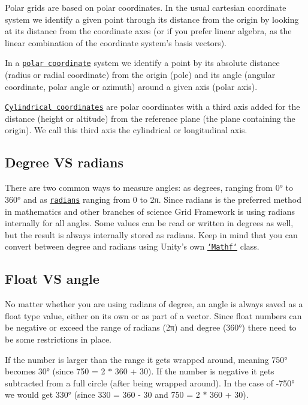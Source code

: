 Polar grids are based on polar coordinates. In the usual cartesian coordinate system we identify a given point through its distance from the origin by looking at its distance from the coordinate axes (or if you prefer linear algebra, as the linear combination of the coordinate system’s basis vectors).

In a \href{http://en.wikipedia.org/wiki/Polar_coordinate_system}{\tt polar coordinate} system we identify a point by its absolute distance (radius or radial coordinate) from the origin (pole) and its angle (angular coordinate, polar angle or azimuth) around a given axis (polar axis).

\href{http://en.wikipedia.org/wiki/Cylindrical_coordinate_system}{\tt Cylindrical coordinates} are polar coordinates with a third axis added for the distance (height or altitude) from the reference plane (the plane containing the origin). We call this third axis the cylindrical or longitudinal axis.

\subsection*{Degree V\+S radians }

There are two common ways to measure angles\+: as degrees, ranging from 0° to 360° and as \href{http://en.wikipedia.org/wiki/Radians}{\tt radians} ranging from 0 to 2π. Since radians is the preferred method in mathematics and other branches of science Grid Framework is using radians internally for all angles. Some values can be read or written in degrees as well, but the result is always internally stored as radians. Keep in mind that you can convert between degree and radians using Unity’s own \href{http://docs.unity3d.com/Documentation/ScriptReference/Mathf.html}{\tt `\+Mathf`} class.

\subsection*{Float V\+S angle }

No matter whether you are using radians of degree, an angle is always saved as a float type value, either on its own or as part of a vector. Since float numbers can be negative or exceed the range of radians (2π) and degree (360°) there need to be some restrictions in place.

If the number is larger than the range it gets wrapped around, meaning 750° becomes 30° (since 750 = 2 $\ast$ 360 + 30). If the number is negative it gets subtracted from a full circle (after being wrapped around). In the case of -\/750° we would get 330° (since 330 = 360 -\/ 30 and 750 = 2 $\ast$ 360 + 30).

